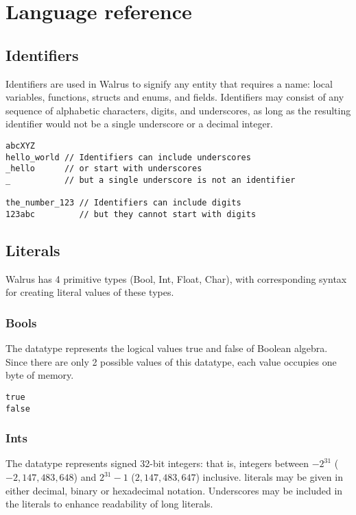\chapter{Language reference}\label{chapter:reference}

\section{Identifiers}\label{section:reference:identifiers}
Identifiers are used in Walrus to signify any entity that requires a name:
local variables, functions, structs and enums, and fields.
Identifiers may consist of any sequence of alphabetic characters, digits, and underscores,
as long as the resulting identifier would not be a single underscore or a decimal integer.

\begin{verbatim}
abcXYZ
hello_world // Identifiers can include underscores
_hello      // or start with underscores
_           // but a single underscore is not an identifier

the_number_123 // Identifiers can include digits
123abc         // but they cannot start with digits
\end{verbatim}

\section{Literals}\label{section:reference:Primitive datatypes}
Walrus has 4 primitive types (Bool, Int, Float, Char), with corresponding syntax
for creating literal values of these types.

\subsection{Bools}\label{section:reference:bools}
The  datatype represents the logical values true and false of Boolean algebra.
Since there are only 2 possible values of this datatype, each  value occupies
one byte of memory.

\begin{verbatim}
true
false
\end{verbatim}

\subsection{Ints}\label{section:reference:ints}
The  datatype represents signed 32-bit integers:
that is, integers between $-2^{31}$ ($-2,147,483,648$) and $2^{31}-1$ ($2,147,483,647$) inclusive.
 literals may be given in either decimal, binary or hexadecimal notation.
Underscores may be included in the  literals to enhance readability of long literals.

